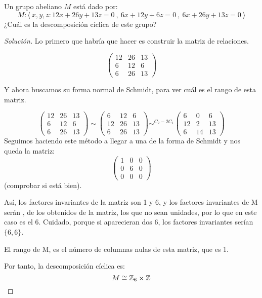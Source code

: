 \begin{ejemplo}
	Un grupo abeliano $M$ está dado por:
	\[
	M: \langle \ x,y,z :  12x+26y+13z = 0  \ , \ 6x+12y+6z = 0 \ , \ 6x+26y+13z = 0 \ \rangle
	\]
	¿Cuál es la descomposición cíclica de este grupo?
\end{ejemplo}
\begin{proof}[Solución]
	Lo primero que habría que hacer es construir la matriz de relaciones.

	\[
	\begin{pmatrix}
 12 & 26 & 13 \\
 6 & 12 & 6 \\
 6 & 26 & 13
\end{pmatrix}
	\]

	Y ahora buscamos su forma normal de Schmidt, para ver cuál es el rango de esta matriz.

	\[
	\begin{pmatrix}
 12 & 26 & 13 \\
 6 & 12 & 6 \\
 6 & 26 & 13
\end{pmatrix} \sim
\begin{pmatrix}
 6 & 12 & 6 \\
 12 & 26 & 13 \\
 6 & 26 & 13
\end{pmatrix} \sim^{C_2 - 2C_1}
\begin{pmatrix}
 6 & 0 & 6 \\
 12 & 2 & 13 \\
 6 & 14& 13
\end{pmatrix}
	\]
	Seguimos haciendo este método a llegar a una de la forma de Schmidt y nos queda la matriz:
	\[
	\begin{pmatrix}
 1 & 0 & 0 \\
 0 & 6 & 0 \\
 0 & 0 & 0
\end{pmatrix}
	\]
	(comprobar si está bien).

	Así, los factores invariantes de la matriz son 1 y 6, y los factores invariantes de M serán , de los obtenidos de la matriz, los que no sean unidades, por lo que en este caso es el 6. Cuidado, porque si aparecieran dos 6, los factores invariantes serían $\{6,6\}$.

	El rango de M, es el número de columnas nulas de esta matriz, que es 1.

	Por tanto, la descomposición cíclica es:
	\[
	M \cong \mathbb{Z}_6 \times \mathbb{Z}
	\]
\end{proof}

